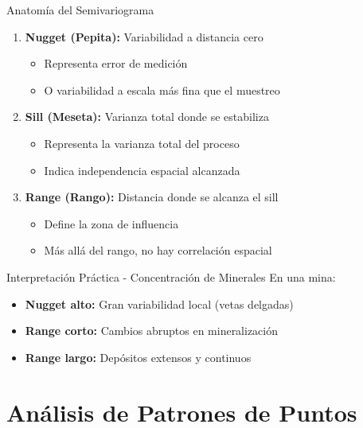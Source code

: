 \documentclass[12pt,a4paper]{article}
\begin{document}
\begin{conceptbox}{Anatomía del Semivariograma}
\begin{enumerate}
    \item \textbf{Nugget (Pepita):} Variabilidad a distancia cero
    \begin{itemize}
        \item Representa error de medición
        \item O variabilidad a escala más fina que el muestreo
    \end{itemize}
    
    \item \textbf{Sill (Meseta):} Varianza total donde se estabiliza
    \begin{itemize}
        \item Representa la varianza total del proceso
        \item Indica independencia espacial alcanzada
    \end{itemize}
    
    \item \textbf{Range (Rango):} Distancia donde se alcanza el sill
    \begin{itemize}
        \item Define la zona de influencia
        \item Más allá del rango, no hay correlación espacial
    \end{itemize}
\end{enumerate}
\end{conceptbox}

\begin{ejemplo}{Interpretación Práctica - Concentración de Minerales}
En una mina:
\begin{itemize}
    \item \textbf{Nugget alto:} Gran variabilidad local (vetas delgadas)
    \item \textbf{Range corto:} Cambios abruptos en mineralización
    \item \textbf{Range largo:} Depósitos extensos y continuos
\end{itemize}
\end{ejemplo}

\section{Análisis de Patrones de Puntos}
\end{document}
